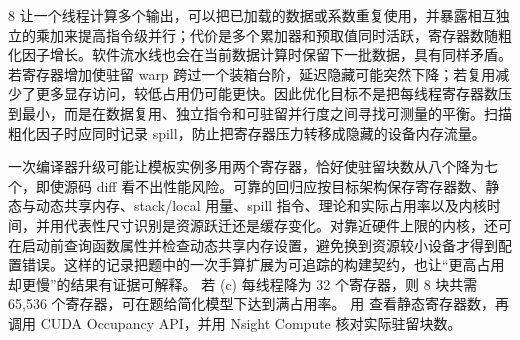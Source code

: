 \begin{solutionexercise}{8}
让一个线程计算多个输出，可以把已加载的数据或系数重复使用，并暴露相互独立的乘加来提高指令级并行；代价是多个累加器和预取值同时活跃，寄存器数随粗化因子增长。软件流水线也会在当前数据计算时保留下一批数据，具有同样矛盾。若寄存器增加使驻留 warp 跨过一个装箱台阶，延迟隐藏可能突然下降；若复用减少了更多显存访问，较低占用仍可能更快。因此优化目标不是把每线程寄存器数压到最小，而是在数据复用、独立指令和可驻留并行度之间寻找可测量的平衡。扫描粗化因子时应同时记录 spill，防止把寄存器压力转移成隐藏的设备内存流量。

一次编译器升级可能让模板实例多用两个寄存器，恰好使驻留块数从八个降为七个，即使源码 diff 看不出性能风险。可靠的回归应按目标架构保存寄存器数、静态与动态共享内存、stack/local 用量、spill 指令、理论和实际占用率以及内核时间，并用代表性尺寸识别是资源跃迁还是缓存变化。对靠近硬件上限的内核，还可在启动前查询函数属性并检查动态共享内存设置，避免换到资源较小设备才得到配置错误。这样的记录把题中的一次手算扩展为可追踪的构建契约，也让“更高占用却更慢”的结果有证据可解释。
\variantheading 若 (c) 每线程降为 32 个寄存器，则 8 块共需 65,536 个寄存器，可在题给简化模型下达到满占用率。
\practiceheading 用  查看静态寄存器数，再调用 CUDA
Occupancy API，并用 Nsight Compute 核对实际驻留块数。
\end{solutionexercise}

